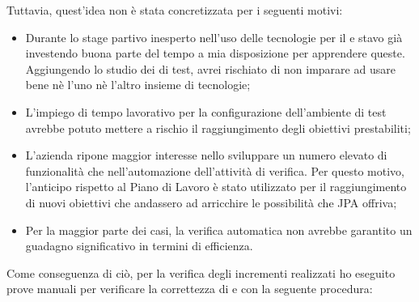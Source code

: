 Tuttavia, quest'idea non è stata concretizzata per i seguenti motivi:

\begin{itemize}
\item Durante lo stage partivo inesperto nell'uso delle tecnologie per il
  \FREND{} e stavo già investendo buona parte del tempo a mia disposizione per
  apprendere queste. Aggiungendo lo studio dei  di test, avrei
  rischiato di non imparare ad usare bene nè l'uno nè l'altro insieme di
  tecnologie;
\item L'impiego di tempo lavorativo per la configurazione dell'ambiente di
  test avrebbe potuto mettere a rischio il raggiungimento degli obiettivi
  prestabiliti;
\item L'azienda ripone maggior interesse nello sviluppare un numero elevato di
  funzionalità che nell'automazione dell'attività di verifica. Per questo
  motivo, l'anticipo rispetto al Piano di Lavoro è stato utilizzato per il
  raggiungimento di nuovi obiettivi che andassero ad arricchire le possibilità
  che JPA offriva;
\item Per la maggior parte dei casi, la verifica automatica non avrebbe
  garantito un guadagno significativo in termini di efficienza.
\end{itemize}

Come conseguenza di ciò, per la verifica degli incrementi realizzati ho
eseguito prove manuali per verificare la correttezza di \BKEND{} e \FREND{}
con la seguente procedura:

